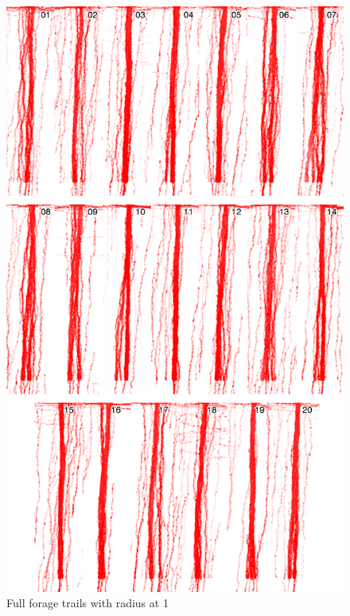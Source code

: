 \begin{figure}[H]
  \centering
  \includegraphics[width=0.8\linewidth]{gfx/radius-1-final.png}
  \caption{Full forage trails with radius at 1}
  \label{fig:radius-1-final}
\end{figure}

